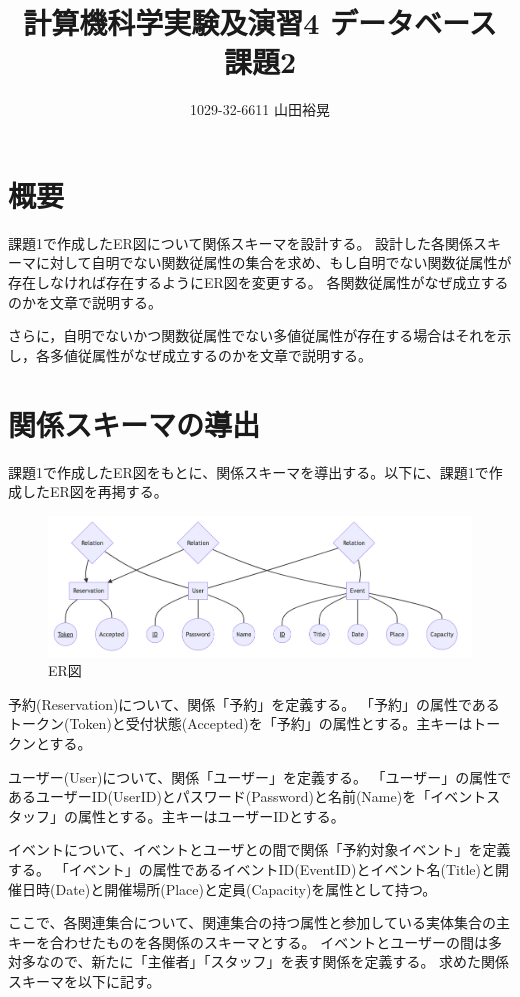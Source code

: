 \documentclass[dvipdfmx]{jarticle}
\begin{document}
\title{計算機科学実験及演習4 データベース 課題2}
\author{1029-32-6611 山田裕晃}
\maketitle

\section{概要}
課題1で作成したER図について関係スキーマを設計する。
設計した各関係スキーマに対して自明でない関数従属性の集合を求め、もし自明でない関数従属性が存在しなければ存在するようにER図を変更する。
各関数従属性がなぜ成立するのかを文章で説明する。

さらに，自明でないかつ関数従属性でない多値従属性が存在する場合はそれを示し，各多値従属性がなぜ成立するのかを文章で説明する。

\section{関係スキーマの導出}
課題1で作成したER図をもとに、関係スキーマを導出する。以下に、課題1で作成したER図を再掲する。
\begin{figure}[H]
  \centering
  \includegraphics[scale=0.4]{ermodel.png}
  \caption{ER図}
\end{figure}

予約(Reservation)について、関係「予約」を定義する。
「予約」の属性であるトークン(Token)と受付状態(Accepted)を「予約」の属性とする。主キーはトークンとする。

ユーザー(User)について、関係「ユーザー」を定義する。
「ユーザー」の属性であるユーザーID(UserID)とパスワード(Password)と名前(Name)を「イベントスタッフ」の属性とする。主キーはユーザーIDとする。

イベントについて、イベントとユーザとの間で関係「予約対象イベント」を定義する。
「イベント」の属性であるイベントID(EventID)とイベント名(Title)と開催日時(Date)と開催場所(Place)と定員(Capacity)を属性として持つ。

ここで、各関連集合について、関連集合の持つ属性と参加している実体集合の主キーを合わせたものを各関係のスキーマとする。
イベントとユーザーの間は多対多なので、新たに「主催者」「スタッフ」を表す関係を定義する。
求めた関係スキーマを以下に記す。
\end{document}
